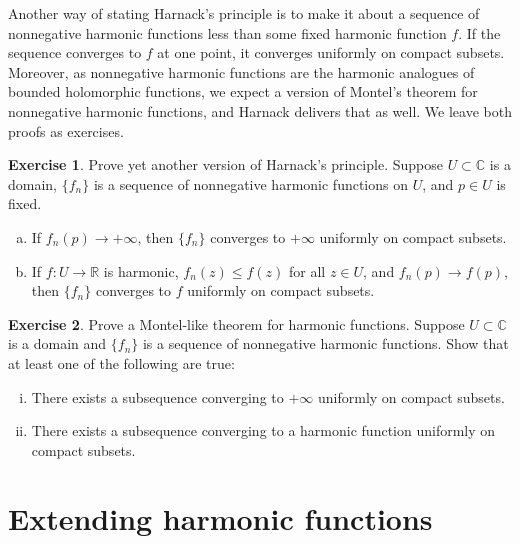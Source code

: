 \documentclass[12pt,openany]{book}
\newcommand{\C}{{\mathbb{C}}}
\newcommand{\R}{{\mathbb{R}}}
\theoremstyle{plain}
\theoremstyle{remark}
\theoremstyle{definition}
\newenvironment{exbox}{%
    \def\FrameCommand{\vrule width 1pt \relax\hspace{10pt}}%
    \MakeFramed{\advance\hsize-\width\FrameRestore}%
}{%
    \endMakeFramed
}
\newenvironment{exparts}{%
    \leavevmode\begin{enumerate}[a),noitemsep,topsep=0pt,parsep=0pt,partopsep=0pt]
}{%
    \end{enumerate}
}
\theoremstyle{exercise}
\newtheorem{exercise}{Exercise}[section]
\theoremstyle{example}
\begin{document}
Another way of stating Harnack's principle is to make it about
a sequence of nonnegative harmonic functions less
than some fixed harmonic function $f$.  If the sequence converges to $f$ at
one point, it converges uniformly on compact subsets.  Moreover, as
nonnegative harmonic functions are the harmonic analogues of bounded holomorphic
functions, we expect a version of Montel's theorem for nonnegative harmonic
functions, and Harnack delivers that as well.  We leave both proofs as
exercises.

\begin{exbox}
\begin{exercise}
Prove yet another version of Harnack's principle.
Suppose $U \subset \C$ is a domain,
$\{ f_n \}$ is a sequence of nonnegative harmonic functions on
$U$, and $p \in U$ is fixed.
\begin{exparts}
\item
If $f_n(p) \to +\infty$, then $\{ f_n \}$ converges to $+\infty$ uniformly on
compact subsets.
\item
If $f \colon U \to \R$ is harmonic, $f_n(z) \leq f(z)$ for all $z \in U$,
and $f_n(p) \to f(p)$, then $\{ f_n \}$ converges to $f$ uniformly on
compact subsets.
\end{exparts}
\end{exercise}

\begin{exercise}
Prove a Montel-like theorem for harmonic functions.  Suppose $U \subset \C$
is a domain and $\{ f_n \}$ is a sequence of nonnegative harmonic functions.
Show that at least one of the following are true:
\begin{enumerate}[(i)]
\item
There exists a subsequence converging to $+\infty$ uniformly on compact subsets.
\item
There exists a subsequence converging to a harmonic function
uniformly on compact subsets.
\end{enumerate}
\end{exercise}
\end{exbox}



\section{Extending harmonic functions}
\end{document}
